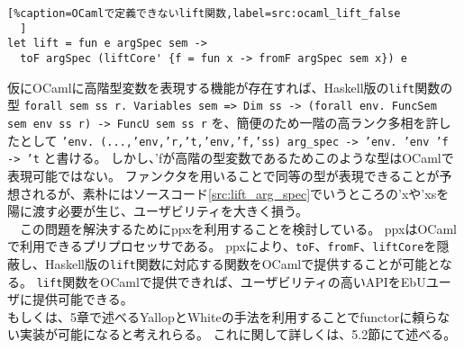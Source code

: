 \documentclass[uplatex]{sumiilab-paper}
\theoremstyle{mystyle}
\numberwithin{definition}{chapter} %
\begin{document}
\begin{lstlisting}[%caption=OCamlで定義できないlift関数,label=src:ocaml_lift_false
  ]
let lift = fun e argSpec sem -> 
  toF argSpec (liftCore' {f = fun x -> fromF argSpec sem x}) e
\end{lstlisting}

仮にOCamlに高階型変数を表現する機能が存在すれば、Haskell版の{\tt lift}関数の型
{\tt forall sem ss r. Variables sem => Dim ss -> (forall env. FuncSem sem env ss r) -> FuncU sem ss r}
を、簡便のため一階の高ランク多相を許したとして
{\tt {'env. (...,'env,'r,'t,'env,'f,'ss) arg\_spec} -> {'env. 'env 'f} -> 't}
と書ける。
しかし、'fが高階の型変数であるためこのような型はOCamlで表現可能ではない。
ファンクタを用いることで同等の型が表現できることが予想されるが、素朴にはソースコード\ref{src:lift_arg_spec}でいうところの'xや'xsを陽に渡す必要が生じ、ユーザビリティを大きく損う。\\
　この問題を解決するためにppxを利用することを検討している。
ppxはOCamlで利用できるプリプロセッサである。
ppxにより、{\tt toF}、{\tt fromF}、{\tt liftCore}を隠蔽し、Haskell版の{\tt lift}関数に対応する関数をOCamlで提供することが可能となる。
{\tt lift}関数をOCamlで提供できれば、ユーザビリティの高いAPIをEbUユーザに提供可能できる。\\
もしくは、5章で述べるYallopとWhiteの手法\cite{hkp_yallop}を利用することでfunctorに頼らない実装が可能になると考えれらる。
これに関して詳しくは、5.2節にて述べる。
\end{document}
